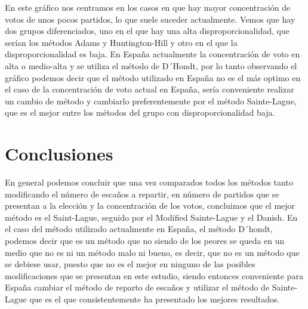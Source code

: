 \documentclass[12pt,a4paper,]{book}
\def\ifdoblecara{} %
\def\ifprincipal{} %
\numberwithin{dummy}{section}
\theoremstyle{ocrenumbox}
\theoremstyle{blacknumex}
\theoremstyle{blacknumbox}
\theoremstyle{ocrenum}
\theoremstyle{ocrenum}
\begin{document}
En este gráfico nos centramos en los casos en que hay mayor
concentración de votos de unos pocos partidos, lo que suele suceder
actualmente. Vemos que hay dos grupos diferenciados, uno en el que hay
una alta disproporcionalidad, que serían los métodos Adams y
Huntington-Hill y otro en el que la disproporcionalidad es baja. En
España actualmente la concentración de voto en alta o medio-alta y se
utiliza el método de D´Hondt, por lo tanto observando el gráfico podemos
decir que el método utilizado en España no es el más optimo en el caso
de la concentración de voto actual en España, sería conveniente realizar
un cambio de método y cambiarlo preferentemente por el método
Sainte-Lague, que es el mejor entre los métodos del grupo con
disproporcionalidad baja.

\hypertarget{conclusiones}{%
\section{Conclusiones}\label{conclusiones}}

En general podemos concluir que una vez comparados todos los métodos
tanto modificando el número de escaños a repartir, en número de partidos
que se presentan a la elección y la concentración de los votos,
concluimos que el mejor método es el Saint-Lague, seguido por el
Modified Sainte-Lague y el Danish. En el caso del método utilizado
actualmente en España, el método D´hondt, podemos decir que es un método
que no siendo de los peores se queda en un medio que no es ni un método
malo ni bueno, es decir, que no es un método que se debiese usar, puesto
que no es el mejor en ninguno de las posibles modificaciones que se
presentan en este estudio, siendo entonces conveniente para España
cambiar el método de reparto de escaños y utilizar el método de
Sainte-Lague que es el que consistentemente ha presentado los mejores
resultados.

\FloatBarrier

\ifdefined\ifprincipal
\else
\setlength{\parindent}{1em}
\pagestyle{fancy}
\setcounter{tocdepth}{4}
\tableofcontents

\fi

\ifdefined\ifdoblecara
\fancyhead{}{}
\fancyhead[LE,RO]{\scriptsize\rightmark}
\fancyfoot[LO,RE]{\scriptsize\slshape \leftmark}
\fancyfoot[C]{}
\fancyfoot[LE,RO]{\footnotesize\thepage}
\else
\fancyhead{}{}
\fancyhead[RO]{\scriptsize\rightmark}
\fancyfoot[LO]{\scriptsize\slshape \leftmark}
\fancyfoot[C]{}
\fancyfoot[RO]{\footnotesize\thepage}
\fi
\renewcommand{\headrulewidth}{0.4pt}
\renewcommand{\footrulewidth}{0.4pt}
\end{document}
